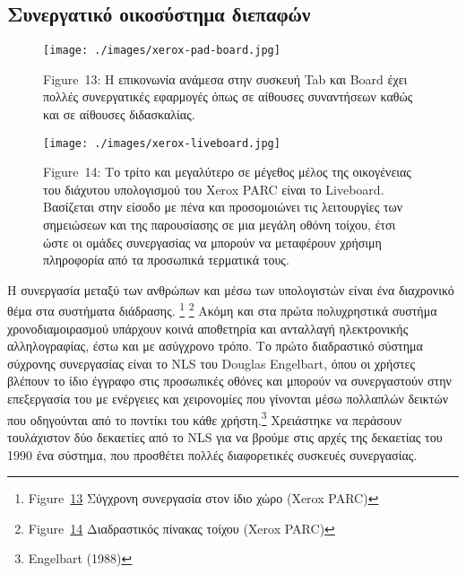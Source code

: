 \documentclass[
]{article}
\begin{document}
\hypertarget{ux3c3ux3c5ux3bdux3b5ux3c1ux3b3ux3b1ux3c4ux3b9ux3baux3cc-ux3bfux3b9ux3baux3bfux3c3ux3cdux3c3ux3c4ux3b7ux3bcux3b1-ux3b4ux3b9ux3b5ux3c0ux3b1ux3c6ux3ceux3bd}{%
\subsection{Συνεργατικό οικοσύστημα
διεπαφών}\label{ux3c3ux3c5ux3bdux3b5ux3c1ux3b3ux3b1ux3c4ux3b9ux3baux3cc-ux3bfux3b9ux3baux3bfux3c3ux3cdux3c3ux3c4ux3b7ux3bcux3b1-ux3b4ux3b9ux3b5ux3c0ux3b1ux3c6ux3ceux3bd}}

\leavevmode{}%
\begin{figure}
\hypertarget{fig:xerox-pad-board}{%
\centering
\texttt{[image: ./images/xerox-pad-board.jpg]}
\caption{Figure~13: Η επικονωνία ανάμεσα στην συσκευή Tab και Board έχει
πολλές συνεργατικές εφαρμογές όπως σε αίθουσες συναντήσεων καθώς και σε
αίθουσες διδασκαλίας.}\label{fig:xerox-pad-board}
}
\end{figure}

\leavevmode{}%
\begin{figure}
\hypertarget{fig:xerox-liveboard}{%
\centering
\texttt{[image: ./images/xerox-liveboard.jpg]}
\caption{Figure~14: Το τρίτο και μεγαλύτερο σε μέγεθος μέλος της
οικογένειας του διάχυτου υπολογισμού του Xerox PARC είναι το Liveboard.
Βασίζεται στην είσοδο με πένα και προσομοιώνει τις λειτουργίες των
σημειώσεων και της παρουσίασης σε μια μεγάλη οθόνη τοίχου, έτσι ώστε οι
ομάδες συνεργασίας να μπορούν να μεταφέρουν χρήσιμη πληροφορία από τα
προσωπικά τερματικά τους.}\label{fig:xerox-liveboard}
}
\end{figure}

Η συνεργασία μεταξύ των ανθρώπων και μέσω των υπολογιστών είναι ένα
διαχρονικό θέμα στα συστήματα διάδρασης. \footnote{Figure~\protect\hyperlink{fig:xerox-pad-board}{13}
  Σύγχρονη συνεργασία στον ίδιο χώρο (Xerox PARC)} \footnote{Figure~\protect\hyperlink{fig:xerox-liveboard}{14}
  Διαδραστικός πίνακας τοίχου (Xerox PARC)} Ακόμη και στα πρώτα
πολυχρηστικά συστήμα χρονοδιαμοιρασμού υπάρχουν κοινά αποθετηρία και
ανταλλαγή ηλεκτρονικής αλληλογραφίας, έστω και με ασύγχρονο τρόπο. Το
πρώτο διαδραστικό σύστημα σύχρονης συνεργασίας είναι το NLS του Douglas
Engelbart, όπου οι χρήστες βλέπουν το ίδιο έγγραφο στις προσωπικές
οθόνες και μπορούν να συνεργαστούν στην επεξεργασία του με ενέργειες και
χειρονομίες που γίνονται μέσω πολλαπλών δεικτών που οδηγούνται από το
ποντίκι του κάθε χρήστη.\footnote{Engelbart (1988)} Χρειάστηκε να
περάσουν τουλάχιστον δύο δεκαετίες από το NLS για να βρούμε στις αρχές
της δεκαετίας του 1990 ένα σύστημα, που προσθέτει πολλές διαφορετικές
συσκευές συνεργασίας.
\end{document}
